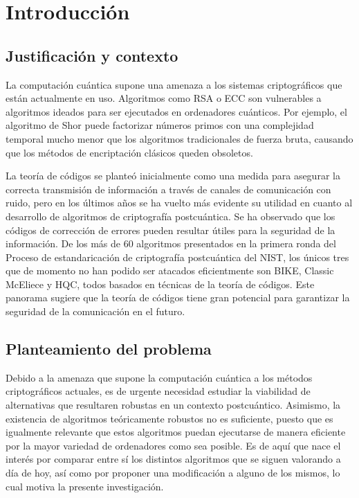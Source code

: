 \newpage{\pagestyle{empty}}
\chapter{Introducción}

\section{Justificación y contexto}

La computación cuántica supone una amenaza a los sistemas criptográficos que están actualmente en uso. Algoritmos como RSA o ECC son vulnerables a algoritmos ideados para ser ejecutados en ordenadores cuánticos. Por ejemplo, el algoritmo de Shor puede factorizar números primos con una complejidad temporal mucho menor que los algoritmos tradicionales de fuerza bruta, causando que los métodos de encriptación clásicos queden obsoletos.

La teoría de códigos se planteó inicialmente como una medida para asegurar la correcta transmisión de información a través de canales de comunicación con ruido, pero en los últimos años se ha vuelto más evidente su utilidad en cuanto al desarrollo de algoritmos de criptografía postcuántica. Se ha observado que los códigos de corrección de errores pueden resultar útiles para la seguridad de la información. De los más de 60 algoritmos presentados en la primera ronda del  Proceso de estandaricación de criptografía postcuántica del NIST, los únicos tres que de momento no han podido ser atacados eficientmente son BIKE, Classic McEliece y HQC, todos basados en técnicas de la teoría de códigos. Este panorama sugiere que la teoría de códigos tiene gran potencial para garantizar la seguridad de la comunicación en el futuro.

\section{Planteamiento del problema}

Debido a la amenaza que supone la computación cuántica a los métodos criptográficos actuales, es de urgente necesidad estudiar la viabilidad de alternativas que resultaren robustas en un contexto postcuántico. Asimismo, la existencia de algoritmos teóricamente robustos no es suficiente, puesto que es igualmente relevante que estos algoritmos puedan ejecutarse de manera eficiente por la mayor variedad de ordenadores como sea posible. Es de aquí que nace el interés por comparar entre sí los distintos algoritmos que se siguen valorando a día de hoy, así como por proponer una modificación a alguno de los mismos, lo cual motiva la presente investigación.

